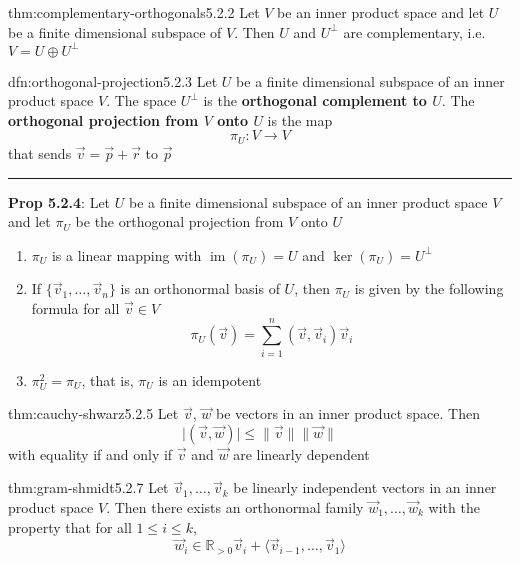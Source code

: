 \documentclass[landscape, 8pt]{extarticle}
\DeclareMathOperator{\im}{im}
\begin{document}
\begin{multicols}{3}
\newpage

\begin{thm}{thm:complementary-orthogonals}{5.2.2}
    Let $V$ be an inner product space and let $U$ be a finite dimensional subspace of $V$. Then $U$ and $U^{\bot}$ are complementary, i.e. $V = U \oplus U^{\bot}$
\end{thm}

\begin{dfn}{dfn:orthogonal-projection}{5.2.3}
    Let $U$ be a finite dimensional subspace of an inner product space $V$. The space $U^{\bot}$ is the \textbf{orthogonal complement to $U$}. The \textbf{orthogonal projection from $V$ onto $U$} is the map
    \[\pi_{U} : V \to V\]
    that sends $\vec{v} = \vec{p} + \vec{r}$ to $\vec{p}$

    \noindent\rule{\textwidth}{0.2pt}
    \textbf{Prop 5.2.4}: Let $U$ be a finite dimensional subspace of an inner product space $V$ and let $\pi_{U}$ be the orthogonal projection from $V$ onto $U$
    \begin{enumerate}
        \setlength\itemsep{0em}
        \item $\pi_{U}$ is a linear mapping with $\im(\pi_{U}) = U$ and $\ker (\pi_{U}) = U^{\bot}$
        \item If $\{\vec{v}_{1},\dots,\vec{v}_{n}\}$ is an orthonormal basis of $U$, then $\pi_{U}$ is given by the following formula for all $\vec{v}\in V$
            \[\pi_{U}(\vec{v}) = \sum_{i = 1}^{n} (\vec{v}, \vec{v}_{i}) \vec{v}_{i}\]
        \item $\pi_{U}^{2} = \pi_{U}$, that is, $\pi_{U}$ is an idempotent
    \end{enumerate}
\end{dfn}


\begin{thm}{thm:cauchy-shwarz}{5.2.5}
    Let $\vec{v}$, $\vec{w}$ be vectors in an inner product space. Then
    \[\lvert (\vec{v}, \vec{w}) \rvert \le \lVert \vec{v} \rVert \lVert \vec{w} \rVert\]
    with equality if and only if $\vec{v}$ and $\vec{w}$ are linearly dependent
\end{thm}

\vspace{-5pt}
\begin{thm}{thm:gram-shmidt}{5.2.7}
    Let $\vec{v}_{1},\dots,\vec{v}_{k}$ be linearly independent vectors in an inner product space $V$. Then there exists an orthonormal family $\vec{w}_{1},\dots,\vec{w}_{k}$ with the property that for all $1 \le i \le k$,
    \[\vec{w}_{i} \in \mathbb{R}_{>0} \vec{v}_{i} + \langle \vec{v}_{i - 1},\dots,\vec{v}_{1} \rangle\]


\end{thm}
\end{multicols}
\end{document}
